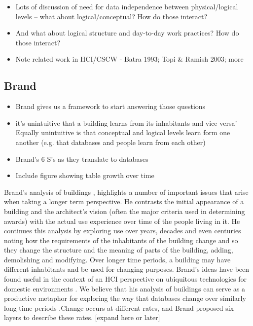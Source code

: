 \begin{itemize}
\item Lots of discussion of need for data independence between physical/logical levels – what about logical/conceptual? How do those interact?
\item And what about logical structure and day-to-day work practices? How do those interact?
\item Note related work in HCI/CSCW - Batra 1993; Topi & Ramish 2003; more
\end{itemize}

\subsection{Brand}

\begin{itemize}
\item Brand gives us a framework to start answering those questions
\item	it's unintuitive that a building learns from its inhabitants and vice versa’ Equally unintuitive is that conceptual and logical levels learn form one another (e.g. that databases and people learn from each other)
\item Brand’s 6 S’s as they translate to databases
\item Include figure showing table growth over time
\end{itemize}
Brand’s analysis of buildings \cite{brand1995buildings}, highlights a number of important issues that arise when taking a longer term perspective. He contrasts the initial appearance of a building and the architect’s vision (often the major criteria used in determining awards) with the actual use experience over time of the people living in it. He continues this analysis by exploring use over years, decades and even centuries noting how the requirements of the inhabitants of the building change and so they change the structure and the meaning of parts of the building, adding, demolishing and modifying. Over longer time periods, a building may have different inhabitants and be used for changing purposes. Brand’s ideas have been found useful in the context of an HCI perspective on ubiquitous technologies for domestic environments \cite{rodden2003evolution}. We believe that his analysis of buildings can serve as a productive metaphor for exploring the way that databases change over similarly long time periods 
 \cite{thomer2014databases}.Change occurs at different rates, and Brand proposed six layers to describe these rates. [expand here or later]  
